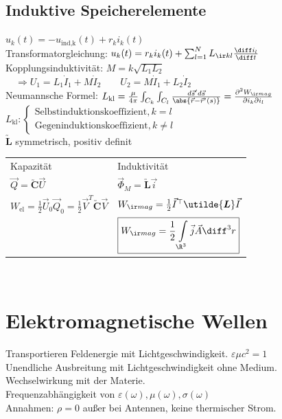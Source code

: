 \documentclass[german, fourcolumn, 6pt]{latex4ei/latex4ei_sheet}
\renewcommand{\ma}[1]{\ensuremath{\utilde{\boldsymbol {#1}}}}
\begin{document}
    \subsection{Induktive Speicherelemente}
$u_k(t) = -u_{\text{ind,k}}(t) + r_ki_k(t)$\\
    Transformatorgleichung: $u_k(t) = r_ki_k(t)+\sum_{l=1}^N L_{\ir kl} \frac{\diff i_l}{\diff t}$\\
    Kopplungsinduktivität: $M = k\sqrt{L_1L_2}$\\
$\quad\Rightarrow U_1=L_1\dot{I}_1 + M\dot{I}_2\qquad U_2 = M\dot{I}_1+L_2\dot{I}_2$\\
    Neumannsche Formel: $L_{\text{kl}} = \frac{\mu}{4\pi}\int_{C_k}\int_{C_l} \frac{d\vec s'  d\vec s}{\abs{\vec r - \vec r'(s)}} = \frac{\partial^2W_{\ir mag}}{\partial i_k\partial i_l}$ \\
$L_{\text{kl}} : \begin{cases}\text{Selbstinduktionskoeffizient}, k=l\\\text{Gegeninduktionskoeffizient}, k \neq l\end{cases}$\\
$\ma L$ symmetrisch, positiv definit



    \begin{tabular*}{\columnwidth}{@{\extracolsep\fill}ll@{}} \trule
    Kapazität & Induktivität\\
$\vec Q = \ma C \vec U$ & $\vec \Phi_M = \ma L \vec i$\\
$W_{\text{el}} = \frac{1}{2}\vec U_0\vec Q_0 = \frac{1}{2}\vec V^T\ma C\vec V$ & $W_{\ir mag} = \frac{1}{2} \vec I^\top \ma L \vec I$\\
    & $\boxed{ W_{\ir mag} = \frac{1}{2} \int\limits_{\R^3} \vec j  \vec A \diff^3 r }	$
    \end{tabular*}\\
    \columnbreak

    \section{Elektromagnetische Wellen}
    Transportieren Feldenergie mit Lichtgeschwindigkeit. $\varepsilon \mu c^2 = 1$\\
    Unendliche Ausbreitung mit Lichtgeschwindigkeit ohne Medium.\\
    Wechselwirkung mit der Materie.\\
    Frequenzabhängigkeit von $\varepsilon(\omega),\mu(\omega),\sigma(\omega)$\\
    Annahmen: $\rho = 0$ außer bei Antennen, keine thermischer Strom.\\
\end{document}
